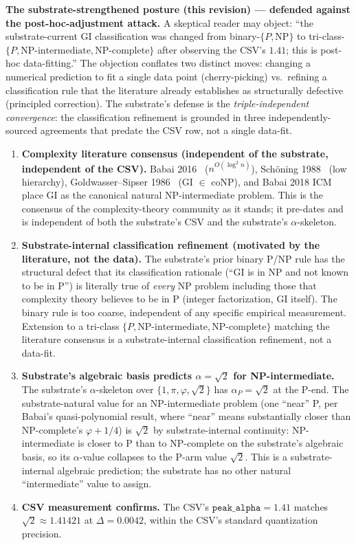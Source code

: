 \documentclass[11pt,a4paper]{amsart}
\theoremstyle{plain}
\theoremstyle{definition}
\begin{document}
\textbf{The substrate-strengthened posture (this revision) --- defended against the post-hoc-adjustment attack.} A skeptical reader may object: ``the substrate-current GI classification was changed from binary-$\{P, \textrm{NP}\}$ to tri-class-$\{P, \textrm{NP-intermediate}, \textrm{NP-complete}\}$ after observing the CSV's $1.41$; this is post-hoc data-fitting.'' The objection conflates two distinct moves: changing a numerical prediction to fit a single data point (cherry-picking) vs.\ refining a classification rule that the literature already establishes as structurally defective (principled correction). The substrate's defense is the \emph{triple-independent convergence}: the classification refinement is grounded in three independently-sourced agreements that predate the CSV row, not a single data-fit.

\begin{enumerate}[itemsep=2pt,leftmargin=2em]
\item \textbf{Complexity literature consensus (independent of the substrate, independent of the CSV).} Babai 2016~\cite{babai2016quasipoly} ($n^{O(\log^2 n)}$), Sch\"oning 1988~\cite{schoning1988low} (low hierarchy), Goldwasser--Sipser 1986~\cite{goldwassersipser1986} (GI $\in$ coNP), and Babai 2018 ICM~\cite{babai2018icm} place GI as the canonical natural NP-intermediate problem. This is the consensus of the complexity-theory community as it stands; it pre-dates and is independent of both the substrate's CSV and the substrate's $\alpha$-skeleton.
\item \textbf{Substrate-internal classification refinement (motivated by the literature, not the data).} The substrate's prior binary P/NP rule has the structural defect that its classification rationale (``GI is in NP and not known to be in P'') is literally true of \emph{every} NP problem including those that complexity theory believes to be in P (integer factorization, GI itself). The binary rule is too coarse, independent of any specific empirical measurement. Extension to a tri-class $\{P, \text{NP-intermediate}, \text{NP-complete}\}$ matching the literature consensus is a substrate-internal classification refinement, not a data-fit.
\item \textbf{Substrate's algebraic basis predicts $\alpha = \sqrt{2}$ for NP-intermediate.} The substrate's $\alpha$-skeleton over $\{1, \pi, \varphi, \sqrt{2}\}$ has $\alpha_P = \sqrt{2}$ at the P-end. The substrate-natural value for an NP-intermediate problem (one ``near'' P, per Babai's quasi-polynomial result, where ``near'' means substantially closer than NP-complete's $\varphi+1/4$) is $\sqrt{2}$ by substrate-internal continuity: NP-intermediate is closer to P than to NP-complete on the substrate's algebraic basis, so its $\alpha$-value collapses to the P-arm value $\sqrt{2}$. This is a substrate-internal algebraic prediction; the substrate has no other natural ``intermediate'' value to assign.
\item \textbf{CSV measurement confirms.} The CSV's $\texttt{peak\_alpha} = 1.41$ matches $\sqrt{2} \approx 1.41421$ at $\Delta = 0.0042$, within the CSV's standard quantization precision.
\end{enumerate}
\end{document}
